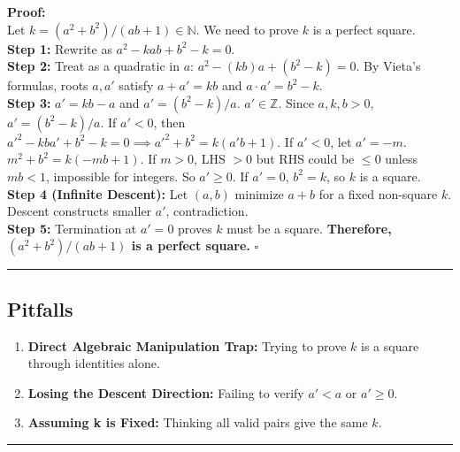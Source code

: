 \documentclass{article}
\begin{document}
\noindent \textbf{Proof:} \\
Let $k = (a^2 + b^2)/(ab + 1) \in \mathbb{N}$. We need to prove $k$ is a perfect square. \\
\textbf{Step 1:} Rewrite as $a^2 - kab + b^2 - k = 0$. \\
\textbf{Step 2:} Treat as a quadratic in $a$: $a^2 - (kb)a + (b^2 - k) = 0$. By Vieta's formulas, roots $a, a'$ satisfy $a + a' = kb$ and $a \cdot a' = b^2 - k$. \\
\textbf{Step 3:} $a' = kb - a$ and $a' = (b^2 - k)/a$. $a' \in \mathbb{Z}$. Since $a, k, b > 0$, $a' = (b^2 - k)/a$. If $a' < 0$, then $a'^2 - kba' + b^2 - k = 0 \implies a'^2 + b^2 = k(a'b + 1)$. If $a' < 0$, let $a' = -m$. $m^2 + b^2 = k(-mb + 1)$. If $m > 0$, LHS $> 0$ but RHS could be $\leq 0$ unless $mb < 1$, impossible for integers. So $a' \geq 0$. If $a' = 0$, $b^2 = k$, so $k$ is a square. \\
\textbf{Step 4 (Infinite Descent):} Let $(a, b)$ minimize $a+b$ for a fixed non-square $k$. Descent constructs smaller $a'$, contradiction. \\
\textbf{Step 5:} Termination at $a'=0$ proves $k$ must be a square. \textbf{Therefore, $(a^2 + b^2)/(ab + 1)$ is a perfect square.} \hfill $\square$

\noindent \rule{\textwidth}{0.4pt}

\subsection*{Pitfalls}
\begin{enumerate}
    \item \textbf{Direct Algebraic Manipulation Trap:} Trying to prove $k$ is a square through identities alone.
    \item \textbf{Losing the Descent Direction:} Failing to verify $a' < a$ or $a' \geq 0$.
    \item \textbf{Assuming k is Fixed:} Thinking all valid pairs give the same $k$.
\end{enumerate}

\noindent \rule{\textwidth}{0.4pt}
\end{document}
